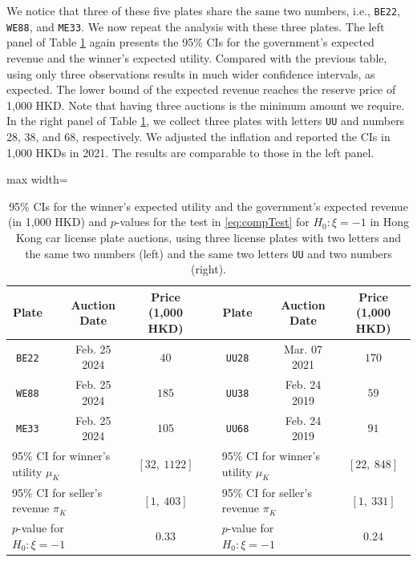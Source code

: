 We notice that three of these five plates share the same two numbers, i.e., \texttt{BE22}, \texttt{WE88}, and \texttt{ME33}. We now repeat the analysis with these three plates. The left panel of Table \ref{tab:case22} again presents the 95\% CIs for the government's expected revenue and the winner's expected utility. Compared with the previous table, using only three observations results in much wider confidence intervals, as expected. The lower bound of the expected revenue reaches the reserve price of 1,000 HKD. Note that having three auctions is the minimum amount we require. In the right panel of Table \ref{tab:case22}, we collect three plates with letters \texttt{UU} and numbers 28, 38, and 68, respectively. We adjusted the inflation and reported the CIs in 1,000 HKDs in 2021. The results are comparable to those in the left panel. 

\begin{table}
\renewcommand{\arraystretch}{1.5}
\centering
\begin{adjustbox}{max width=\textwidth}
\begin{tabular}{ccccccccc}
\hline\hline
Plate &  & Auction Date & Price (1,000 HKD) &  & Plate &  & Auction Date & 
Price (1,000 HKD) \\ \hline
\texttt{BE22} &  & Feb. 25 2024 & $40$  &  & \texttt{UU28} &  & Mar. 07 2021 & $170$ \\ 
\texttt{WE88} &  & Feb. 25 2024 & $185$ &  & \texttt{UU38} &  & Feb. 24 2019 & $59$ \\ 
\texttt{ME33} &  & Feb. 25 2024 & $105$ &  & \texttt{UU68} &  & Feb. 24 2019 & $91$ \\ \hline
\multicolumn{3}{l}{95\% CI for winner's utility $\mu _{K}$} & $[32,~1122]$ & & \multicolumn{3}{l}{95\% CI for winner's utility $\mu _{K}$} & $[22,~848]$\\ 
\multicolumn{3}{l}{95\% CI for seller's revenue $\pi _{K}$} & $[1,~ 403]$ &  & \multicolumn{3}{l}{95\% CI for seller's revenue $\pi _{K}$} & $[1, ~331]$ \\ 
\multicolumn{3}{l}{$p$-value for $H_{0}:\xi =-1$} & $0.33$ &  & 
\multicolumn{3}{l}{$p$-value for $H_{0}:\xi =-1$} & $0.24$ \\ 
\hline\hline
\end{tabular}
\end{adjustbox}
\caption{95\% CIs for the winner's expected utility and the government's expected revenue (in 1,000 HKD) and $p$-values for the test in \eqref{eq:compTest} for $H_0:\xi = -1$ in Hong Kong car license plate auctions, using three license plates with two letters and the same two numbers (left) and the same two letters \texttt{UU} and two numbers (right).}\label{tab:case22}
\end{table}

